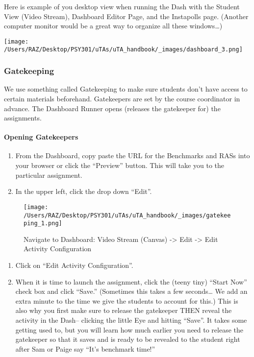 \documentclass[
]{article}
\providecommand{\tightlist}{%
  \setlength{\itemsep}{0pt}\setlength{\parskip}{0pt}}
\begin{document}
Here is example of you desktop view when running the Dash with the Student View (Video Stream), Dashboard Editor Page, and the Instapolls page. (Another computer monitor would be a great way to organize all these windows\ldots)

\texttt{[image: /Users/RAZ/Desktop/PSY301/uTAs/uTA\_handbook/\_images/dashboard\_3.png]}

\hypertarget{gatekeeping}{%
\subsubsection{Gatekeeping}\label{gatekeeping}}

We use something called Gatekeeping to make sure students don't have access to certain materials beforehand. Gatekeepers are set by the course coordinator in advance. The Dashboard Runner opens (releases the gatekeeper for) the assignments.

\hypertarget{opening-gatekeepers}{%
\paragraph{Opening Gatekeepers}\label{opening-gatekeepers}}

\begin{enumerate}
\def\labelenumi{\arabic{enumi}.}
\tightlist
\item
  From the Dashboard, copy paste the URL for the Benchmarks and RASs into your browser or click the ``Preview'' button. This will take you to the particular assignment.\\
\item
  In the upper left, click the drop down ``Edit''.
\end{enumerate}

\begin{figure}
\centering
\texttt{[image: /Users/RAZ/Desktop/PSY301/uTAs/uTA\_handbook/\_images/gatekeeping\_1.png]}
\caption{Navigate to Dashboard: Video Stream (Canvas) -\textgreater{} Edit -\textgreater{} Edit Activity Configuration}
\end{figure}

\begin{enumerate}
\def\labelenumi{\arabic{enumi}.}
\setcounter{enumi}{2}
\item
  Click on ``Edit Activity Configuration''.
\item
  When it is time to launch the assignment, click the (teeny tiny) ``Start Now'' check box and click ``Save.'' (Sometimes this takes a few seconds\ldots{} We add an extra minute to the time we give the students to account for this.) This is also why you first make sure to release the gatekeeper THEN reveal the activity in the Dash-- clicking the little Eye and hitting ``Save''. It takes some getting used to, but you will learn how much earlier you need to release the gatekeeper so that it saves and is ready to be revealed to the student right after Sam or Paige say ``It's benchmark time!''
\end{enumerate}
\end{document}
